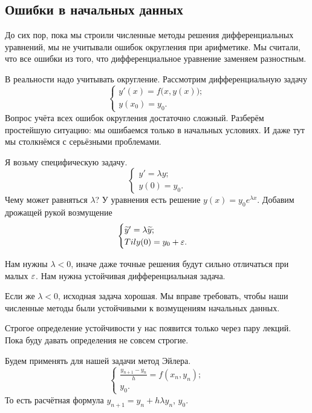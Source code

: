 \subsection{Ошибки в начальных данных}
До сих пор, пока мы строили численные методы решения дифференциальных уравнений, мы не учитывали ошибок округления при арифметике. Мы считали, что все ошибки из того, что дифференциальное уравнение заменяем разностным.

В реальности надо учитывать округление. Рассмотрим дифференциальную задачу
\begin{equation*}
\begin{cases}
y'(x) = f\big(x,y(x)\big);\\
y(x_0) = y_0.
\end{cases}
\end{equation*}
Вопрос учёта всех ошибок округления достаточно сложный. Разберём простейшую ситуацию: мы ошибаемся только в начальных условиях. И даже тут мы столкнёмся с серьёзными проблемами.

Я возьму специфическую задачу.
\begin{equation*}
\begin{cases}
y' = \lambda y;\\
y(0) = y_0.
\end{cases}
\end{equation*}
Чему может равняться $\lambda$? У уравнения есть решение $y(x) = y_0 e^{\lambda x}$. Добавим дрожащей рукой возмущение
\begin{equation*}
\begin{cases}
\widetilde{y}{}' = \lambda \widetilde{y}{};\\
Til y(0) = y_0 + \varepsilon.
\end{cases}
\end{equation*}

Нам нужны $\lambda<0$, иначе даже точные решения будут сильно отличаться при малых $\varepsilon$. Нам нужна устойчивая дифференциальная задача.

Если же $\lambda<0$, исходная задача хорошая. Мы вправе требовать, чтобы наши численные методы были устойчивыми к возмущениям начальных данных.

Строгое определение устойчивости у нас появится только через пару лекций. Пока буду давать определения не совсем строгие.

Будем применять для нашей задачи метод Эйлера.
\[
  \begin{cases}
\frac{ y_{n+1} - y_n}{h} = f(x_n,y_n);\\
y_0.
\end{cases}
\]
То есть расчётная формула $y_{n+1} = y_n + h \lambda y_n$, $y_0$.

